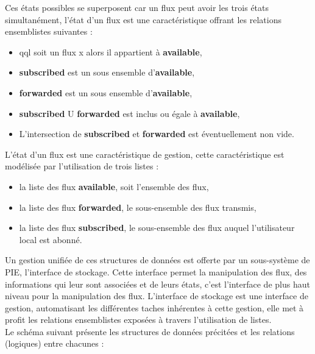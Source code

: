 Ces états possibles se superposent car un flux peut avoir les trois états simultanément,
l'état d'un flux est une caractéristique offrant les relations ensemblistes suivantes : \\

\begin{itemize}
	\item qql soit un flux x alors il appartient à \textbf{available},
	\item \textbf{subscribed} est un sous ensemble d'\textbf{available},
	\item \textbf{forwarded} est un sous ensemble d'\textbf{available},
	\item \textbf{subscribed} U \textbf{forwarded} est inclus ou égale à \textbf{available},
	\item L'intersection de \textbf{subscribed} et \textbf{forwarded} est éventuellement non vide.\\
\end{itemize}

L'état d'un flux est une caractéristique de gestion, cette caractéristique est modélisée
par l'utilisation de trois listes : \\

\begin{itemize}
	\item la liste des flux \textbf{available}, soit l'ensemble des flux,
	\item la liste des flux \textbf{forwarded}, le sous-ensemble des flux transmis,
	\item la liste des flux \textbf{subscribed}, le sous-ensemble des flux auquel l'utilisateur local est abonné. \\
\end{itemize}

Un gestion unifiée de ces structures de données est offerte par un sous-système de PIE,
l'interface de stockage. Cette interface permet la manipulation des flux, des informations 
qui leur sont associées et de leurs états, c'est l'interface de plus haut niveau pour la
manipulation des flux. L'interface de stockage est une interface de gestion, automatisant
les différentes taches inhérentes à cette gestion, elle met à profit les relations ensemblistes 
exposées à travers l'utilisation de listes. \\

Le schéma suivant présente les structures de données précitées et les relations (logiques)
entre chacunes :  \\

